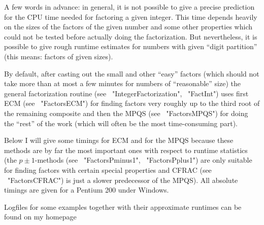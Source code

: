 


A few words in advance: in general, it is not possible to give a precise
prediction for the CPU time needed for factoring a given integer.
This time depends heavily on the sizes of the factors of the given number
and some other properties which could not be tested before actually
doing the factorization.
But nevertheless, it is possible to give rough runtime estimates for
numbers with given ``digit partition'' (this means: factors of given
sizes).

By default, after casting out the small and other ``easy'' factors
(which should not take more than at most a few minutes for numbers of
``reasonable'' size) the general factorization routine 
(see ~"IntegerFactorization", ~"FactInt") uses first ECM
(see ~"FactorsECM") for finding factors very roughly up to the third root
of the remaining composite and then the MPQS (see ~"FactorsMPQS")
for doing the ``rest'' of the work (which will often be the most
time-consuming part).

Below I will give some timings for ECM and for the MPQS because
these methods are by far the most important ones with respect to
runtime statistics (the $p \pm 1$-methods (see ~"FactorsPminus1",
~"FactorsPplus1") are only suitable for finding factors with certain
special properties and CFRAC (see ~"FactorsCFRAC") is just a slower
predecessor of the MPQS). All absolute timings are given for a
Pentium 200 under Windows.

Logfiles for some examples together with their approximate runtimes
can be found on my homepage 


